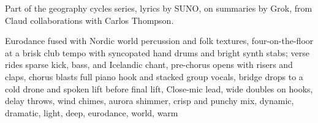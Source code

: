 
\begin{notes}
Part of the geography cycles series, lyrics by SUNO, on summaries by Grok, from Claud collaborations with Carlos Thompson.
\end{notes}
\begin{style}
Eurodance fused with Nordic world percussion and folk textures, four-on-the-floor at a brisk club tempo with syncopated hand drums and bright synth stabs; verse rides sparse kick, bass, and Icelandic chant, pre-chorus opens with risers and claps, chorus blasts full piano hook and stacked group vocals, bridge drops to a cold drone and spoken lift before final lift, Close-mic lead, wide doubles on hooks, delay throws, wind chimes, aurora shimmer, crisp and punchy mix, dynamic, dramatic, light, deep, eurodance, world, warm
\end{style}
